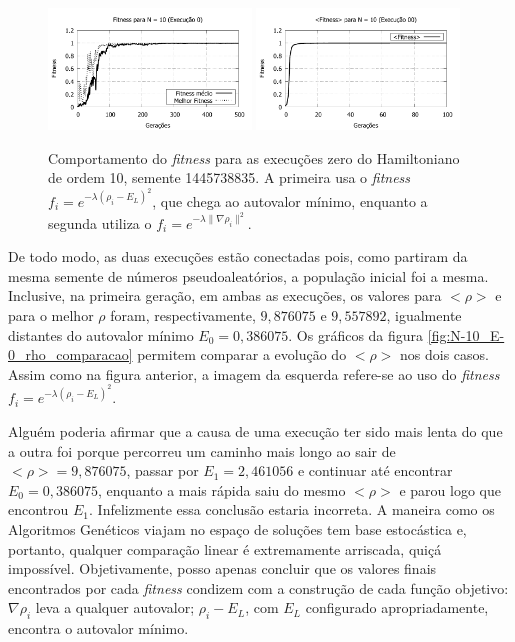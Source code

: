 	\begin{figure}[htbp]
		\centering
			\includegraphics[width=0.48\textwidth]{figs/resultados/fitnessEL/N-10_E-0_fitness.pdf}
			\includegraphics[width=0.48\textwidth]{figs/resultados/fitnessGrad/N10_00_fitness.pdf}
		\caption{Comportamento do \textit{fitness} para as execuções zero do Hamiltoniano de ordem 10, semente 1445738835. A primeira usa o \textit{fitness} $f_i = e^{-\lambda(\rho_i - E_L)^2}$, que chega ao autovalor mínimo, enquanto a segunda utiliza o $f_i = e^{-\lambda \| \nabla \rho_i \|^2}$.}
		\label{fig:N-10_E-0_fitness}
	\end{figure}
	
	De todo modo, as duas execuções estão conectadas pois, como partiram da mesma semente de números pseudoaleatórios, a população inicial foi a mesma. Inclusive, na primeira geração, em ambas as execuções, os valores para $<\rho>$ e para o melhor $\rho$ foram, respectivamente, $9,876075$ e $9,557892$, igualmente distantes do autovalor mínimo $E_0 = 0,386075$. Os gráficos da figura \ref{fig:N-10_E-0_rho_comparacao} permitem comparar a evolução do $<\rho>$ nos dois casos. Assim como na figura anterior, a imagem da esquerda refere-se ao uso do \textit{fitness} $f_i = e^{-\lambda(\rho_i - E_L)^2}$.
	
	Alguém poderia afirmar que a causa de uma execução ter sido mais lenta do que a outra foi porque percorreu um caminho mais longo ao sair de $<\rho> = 9,876075$, passar por $E_1 = 2,461056$ e continuar até encontrar $E_0 = 0,386075$, enquanto a mais rápida saiu do mesmo $<\rho>$ e parou logo que encontrou $E_1$. Infelizmente essa conclusão estaria incorreta. A maneira como os Algoritmos Genéticos viajam no espaço de soluções tem base estocástica e, portanto, qualquer comparação linear é extremamente arriscada, quiçá impossível. Objetivamente, posso apenas concluir que os valores finais encontrados por cada \textit{fitness} condizem com a construção de cada função objetivo: $\nabla \rho_i$ leva a qualquer autovalor; $\rho_i - E_L$, com $E_L$ configurado apropriadamente, encontra o autovalor mínimo.
	
